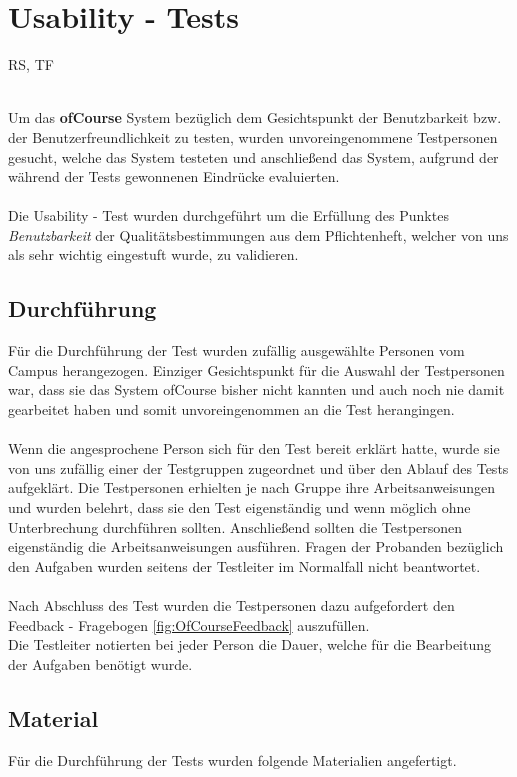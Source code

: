 \chapter{Usability - Tests}
\begin{tiny}
	RS, TF\\
	\ \\
\end{tiny}
Um das \textbf{ofCourse} System bezüglich dem Gesichtspunkt der Benutzbarkeit bzw. der Benutzerfreundlichkeit zu testen,
wurden unvoreingenommene Testpersonen gesucht, welche das System testeten und anschließend das System, aufgrund der
während der Tests gewonnenen Eindrücke evaluierten.\\
\\
Die Usability - Test wurden durchgeführt um die Erfüllung des Punktes {\it Benutzbarkeit} der Qualitätsbestimmungen
aus dem Pflichtenheft, welcher von uns als sehr wichtig eingestuft wurde, zu validieren.

\section{Durchführung}
Für die Durchführung der Test wurden zufällig ausgewählte Personen vom Campus herangezogen. Einziger Gesichtspunkt für die Auswahl der Testpersonen war, dass sie das System ofCourse bisher nicht kannten und auch noch nie damit gearbeitet haben und somit unvoreingenommen an die Test herangingen.\ \\
\ \\
Wenn die angesprochene Person sich für den Test bereit erklärt hatte, wurde sie von uns zufällig einer der Testgruppen zugeordnet und über den Ablauf des Tests aufgeklärt. Die Testpersonen erhielten je nach Gruppe ihre Arbeitsanweisungen und wurden belehrt, dass sie den Test eigenständig und wenn möglich ohne Unterbrechung durchführen sollten. Anschließend sollten die Testpersonen eigenständig die Arbeitsanweisungen ausführen. Fragen der Probanden bezüglich den Aufgaben wurden seitens der Testleiter im Normalfall nicht beantwortet.\\
\ \\
Nach Abschluss des Test wurden die Testpersonen dazu aufgefordert den Feedback - Fragebogen \ref{fig:OfCourseFeedback} auszufüllen.\\
Die Testleiter notierten bei jeder Person die Dauer, welche für die Bearbeitung der Aufgaben benötigt wurde.



\section{Material}
Für die Durchführung der Tests wurden folgende Materialien angefertigt.
